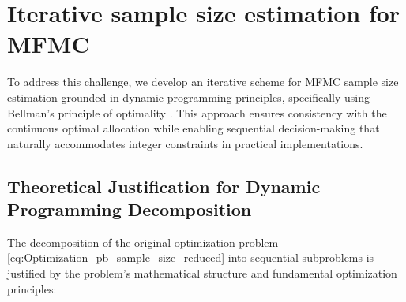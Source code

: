 \section{Iterative sample size estimation for MFMC}\label{sec:Iterative_IntegerValued_Sample_Size}

To address this challenge, we develop an iterative scheme for MFMC sample size estimation grounded in dynamic programming principles, specifically using Bellman's principle of optimality \cite{Be:1957}. This approach ensures consistency with the continuous optimal allocation while enabling sequential decision-making that naturally accommodates integer constraints in practical implementations. 

\subsection{Theoretical Justification for Dynamic Programming Decomposition}

The decomposition of the original optimization problem \eqref{eq:Optimization_pb_sample_size_reduced} into sequential subproblems is justified by the problem's mathematical structure and fundamental optimization principles:


